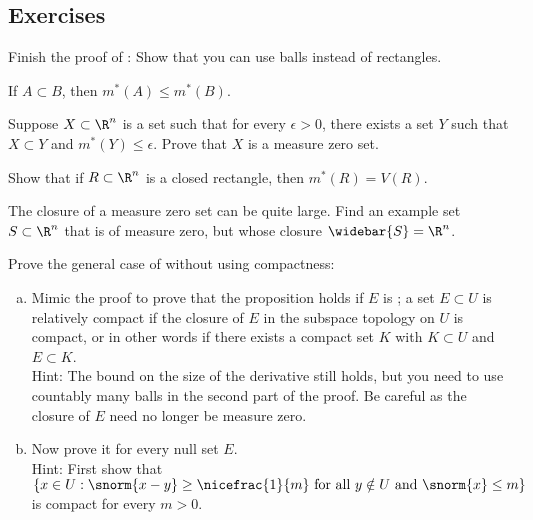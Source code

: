\subsection{Exercises}

\begin{exercise}
Finish the proof of :  Show that you
can use balls instead of rectangles.
\end{exercise}

\begin{exercise} \label{exercise:outermeasuremono}
If $A \subset B$, then $m^*(A) \leq m^*(B)$.
\end{exercise}

\begin{exercise}
Suppose $X \subset \R^n$ is a set such that for every $\epsilon > 0$,
there exists a set $Y$ such that $X \subset Y$ and $m^*(Y) \leq \epsilon$.
Prove that $X$ is a measure zero set.
\end{exercise}

\begin{exercise} \label{exercise:rectanglemeasure}
Show that if $R \subset \R^n$ is a closed rectangle, then $m^*(R) = V(R)$.
\end{exercise}

\begin{exercise}
The closure of a measure zero set can be quite large.  Find an example
set $S \subset \R^n$ that is of measure zero, but whose closure
$\widebar{S} = \R^n$.
\end{exercise}

\begin{exercise}
\pagebreak[2]
Prove the general case of   without using compactness:
\begin{enumerate}[a)]
\item
Mimic the proof to prove that the proposition holds if $E$ is
\emph{}; a set $E \subset U$ is relatively
compact if the closure of $E$ in the subspace topology on $U$ is compact,
or in other words if there exists a compact set $K$ with $K \subset U$
and $E \subset K$.\\
Hint: The bound on the size of the derivative still holds, but you need
to use countably many balls in the second part of the proof.
Be careful as the closure of $E$ need no
longer be measure zero.
\item
Now prove it for every null set $E$.\\
Hint: First show that $\{ x \in U : \snorm{x-y} \geq
\nicefrac{1}{m} \text{ for all } y \notin U \text{ and } \snorm{x} \leq m \}$
is compact for every $m > 0$.
\end{enumerate}
\end{exercise}

